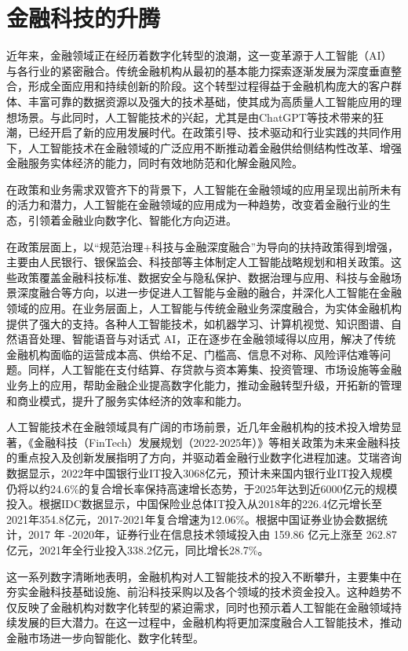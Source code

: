 \setchapterpreamble[u]{\margintoc}
\chapter{金融科技的升腾}
近年来，金融领域正在经历着数字化转型的浪潮，这一变革源于人工智能（AI）与各行业的紧密融合。传统金融机构从最初的基本能力探索逐渐发展为深度垂直整合，形成全面应用和持续创新的阶段。这个转型过程得益于金融机构庞大的客户群体、丰富可靠的数据资源以及强大的技术基础，使其成为高质量人工智能应用的理想场景。与此同时，人工智能技术的兴起，尤其是由ChatGPT等技术带来的狂潮，已经开启了新的应用发展时代。在政策引导、技术驱动和行业实践的共同作用下，人工智能技术在金融领域的广泛应用不断推动着金融供给侧结构性改革、增强金融服务实体经济的能力，同时有效地防范和化解金融风险。

在政策和业务需求双管齐下的背景下，人工智能在金融领域的应用呈现出前所未有的活力和潜力，人工智能在金融领域的应用成为一种趋势，改变着金融行业的生态，引领着金融业向数字化、智能化方向迈进。

在政策层面上，以“规范治理+科技与金融深度融合”为导向的扶持政策得到增强，主要由人民银行、银保监会、科技部等主体制定人工智能战略规划和相关政策。这些政策覆盖金融科技标准、数据安全与隐私保护、数据治理与应用、科技与金融场景深度融合等方向，以进一步促进人工智能与金融的融合，并深化人工智能在金融领域的应用。在业务层面上，人工智能与传统金融业务深度融合，为实体金融机构提供了强大的支持。各种人工智能技术，如机器学习、计算机视觉、知识图谱、自然语音处理、智能语音与对话式 AI，正在逐步在金融领域得以应用，解决了传统金融机构面临的运营成本高、供给不足、门槛高、信息不对称、风险评估难等问题。同样，人工智能在支付结算、存贷款与资本筹集、投资管理、市场设施等金融业务上的应用，帮助金融企业提高数字化能力，推动金融转型升级，开拓新的管理和商业模式，提升了服务实体经济的效率和能力。

人工智能技术在金融领域具有广阔的市场前景，近几年金融机构的技术投入增势显著，《金融科技（FinTech）发展规划（2022-2025年）》等相关政策为未来金融科技的重点投入及创新发展指明了方向，并驱动着金融行业数字化进程加速。艾瑞咨询数据显示，2022年中国银行业IT投入3068亿元，预计未来国内银行业IT投入规模仍将以约24.6\%的复合增长率保持高速增长态势，于2025年达到近6000亿元的规模投入。根据IDC数据显示，中国保险业总体IT投入从2018年的226.4亿元增长至2021年354.8亿元，2017-2021年复合增速为12.06\%。根据中国证券业协会数据统计，2017 年 -2020年，证券行业在信息技术领域投入由 159.86 亿元上涨至 262.87 亿元，2021年全行业投入338.2亿元，同比增长28.7\%。

这一系列数字清晰地表明，金融机构对人工智能技术的投入不断攀升，主要集中在夯实金融科技基础设施、前沿科技采购以及各个领域的技术资金投入。这种趋势不仅反映了金融机构对数字化转型的紧迫需求，同时也预示着人工智能在金融领域持续发展的巨大潜力。在这一过程中，金融机构将更加深度融合人工智能技术，推动金融市场进一步向智能化、数字化转型。


